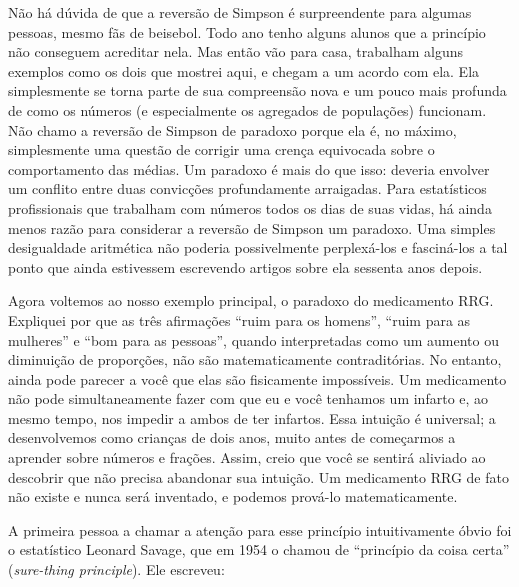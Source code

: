 \documentclass[11pt,a5paper,twoside]{book}
\begin{document}
Não há dúvida de que a reversão de Simpson é surpreendente para algumas pessoas, mesmo fãs de beisebol. Todo ano tenho alguns alunos que a princípio não conseguem acreditar nela. Mas então vão para casa, trabalham alguns exemplos como os dois que mostrei aqui, e chegam a um acordo com ela. Ela simplesmente se torna parte de sua compreensão nova e um pouco mais profunda de como os números (e especialmente os agregados de populações) funcionam. Não chamo a reversão de Simpson de paradoxo porque ela é, no máximo, simplesmente uma questão de corrigir uma crença equivocada sobre o comportamento das médias. Um paradoxo é mais do que isso: deveria envolver um conflito entre duas convicções profundamente arraigadas. Para estatísticos profissionais que trabalham com números todos os dias de suas vidas, há ainda menos razão para considerar a reversão de Simpson um paradoxo. Uma simples desigualdade aritmética não poderia possivelmente perplexá-los e fasciná-los a tal ponto que ainda estivessem escrevendo artigos sobre ela sessenta anos depois.

Agora voltemos ao nosso exemplo principal, o paradoxo do medicamento RRG. Expliquei por que as três afirmações “ruim para os homens”, “ruim para as mulheres” e “bom para as pessoas”, quando interpretadas como um aumento ou diminuição de proporções, não são matematicamente contraditórias. No entanto, ainda pode parecer a você que elas são fisicamente impossíveis. Um medicamento não pode simultaneamente fazer com que eu e você tenhamos um infarto e, ao mesmo tempo, nos impedir a ambos de ter infartos. Essa intuição é universal; a desenvolvemos como crianças de dois anos, muito antes de começarmos a aprender sobre números e frações. Assim, creio que você se sentirá aliviado ao descobrir que não precisa abandonar sua intuição. Um medicamento RRG de fato não existe e nunca será inventado, e podemos prová-lo matematicamente.

A primeira pessoa a chamar a atenção para esse princípio intuitivamente óbvio foi o estatístico Leonard Savage, que em 1954 o chamou de “princípio da coisa certa” (\textit{sure-thing principle}). Ele escreveu:
\end{document}
